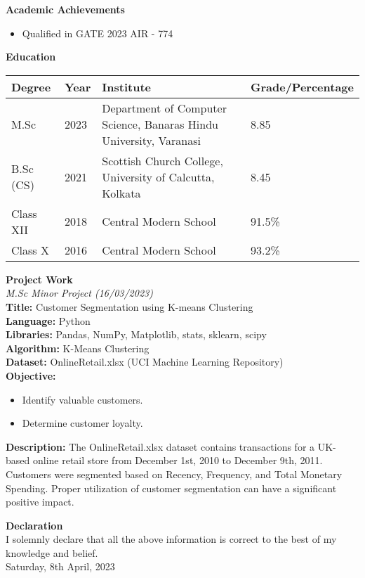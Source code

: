\documentclass[a4paper,10pt]{article}
\begin{document}
\textbf{Academic Achievements} \\
\begin{itemize}
    \item Qualified in GATE 2023 AIR - 774
\end{itemize}

\vspace{0.5cm}

\textbf{Education} \\
\begin{tabular}{|l|l|l|l|}
\hline
\textbf{Degree} & \textbf{Year} & \textbf{Institute} & \textbf{Grade/Percentage} \\
\hline
M.Sc & 2023 & Department of Computer Science, Banaras Hindu University, Varanasi & 8.85 \\
\hline
B.Sc (CS) & 2021 & Scottish Church College, University of Calcutta, Kolkata & 8.45 \\
\hline
Class XII & 2018 & Central Modern School & 91.5\% \\
\hline
Class X & 2016 & Central Modern School & 93.2\% \\
\hline
\end{tabular}

\vspace{0.5cm}

\textbf{Project Work} \\
\textit{M.Sc Minor Project (16/03/2023)} \\
\textbf{Title:} Customer Segmentation using K-means Clustering \\
\textbf{Language:} Python \\
\textbf{Libraries:} Pandas, NumPy, Matplotlib, stats, sklearn, scipy \\
\textbf{Algorithm:} K-Means Clustering \\
\textbf{Dataset:} OnlineRetail.xlsx (UCI Machine Learning Repository) \\
\textbf{Objective:}
\begin{itemize}
    \item Identify valuable customers.
    \item Determine customer loyalty.
\end{itemize}
\textbf{Description:} The OnlineRetail.xlsx dataset contains transactions for a UK-based online retail store from December 1st, 2010 to December 9th, 2011. Customers were segmented based on Recency, Frequency, and Total Monetary Spending. Proper utilization of customer segmentation can have a significant positive impact.


\vspace{0.5cm}

\textbf{Declaration} \\
I solemnly declare that all the above information is correct to the best of my knowledge and belief. \\
Saturday, 8th April, 2023
\end{document}
